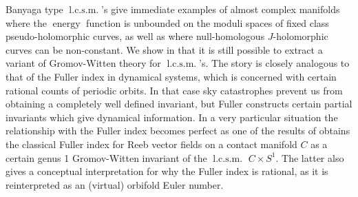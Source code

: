 \documentclass{amsart}
\numberwithin{equation}{section}
\theoremstyle{definition}
\theoremstyle{remark}
\DeclareMathOperator {\energy} {energy}
\DeclareMathOperator{\lcsm}{l.c.s.m.}
\begin{document}
Banyaga type $\lcsm$'s give immediate examples of almost complex manifolds 
where the $\energy$ function is unbounded on the moduli spaces of fixed class pseudo-holomorphic curves, as well as where null-homologous $J$-holomorphic curves can be non-constant.
We show in \cite{citeSavelyevConformalSymplectic} that it is still possible to extract a variant of Gromov-Witten theory for $\lcsm$'s.
The story is closely analogous to that of the Fuller index in dynamical
systems, which is concerned with certain rational counts of periodic orbits. In
that case sky catastrophes prevent us from obtaining a completely well
defined invariant, but Fuller constructs certain partial invariants which give
dynamical information. In a very particular situation the relationship with the
Fuller index becomes perfect as one of the results 
of \cite{citeSavelyevConformalSymplectic} obtains the classical Fuller index for Reeb vector fields on a
contact manifold $C$ as a
certain genus 1 Gromov-Witten invariant of the $\lcsm$ $C \times S ^{1} $. The
latter also gives a conceptual interpretation for why the Fuller index is
rational, as it is reinterpreted as an (virtual) orbifold Euler number.
\end{document}
